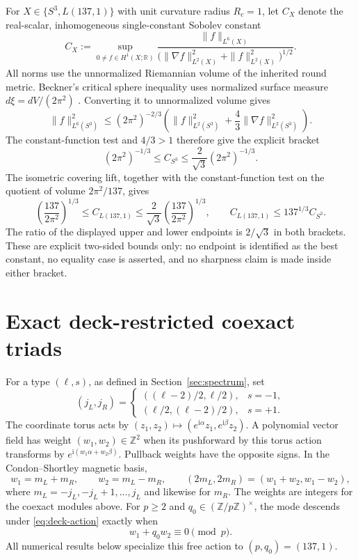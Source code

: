 \documentclass[12pt]{article}
\theoremstyle{definition}
\theoremstyle{remark}
\newcommand{\ZZ}{\mathbb Z}
\newcommand{\ii}{\mathrm i}
\begin{document}
For $X\in\{S^3,L(137,1)\}$ with unit curvature radius $R_c=1$, let $C_X$
denote the real-scalar, inhomogeneous single-constant Sobolev constant
\[
 C_X:=\sup_{0\ne f\in H^1(X;\mathbb R)}
 \frac{\|f\|_{L^6(X)}}
 {\bigl(\|\nabla f\|_{L^2(X)}^2+\|f\|_{L^2(X)}^2\bigr)^{1/2}}.
\]
All norms use the unnormalized Riemannian volume of the inherited round metric.
Beckner's critical sphere inequality uses normalized surface measure
$d\xi=dV/(2\pi^2)$
\cite[p.~4816 and p.~4818, Eq.~(8)]{Beckner1992Sphere}.  Converting it to
unnormalized volume gives
\[
 \|f\|_{L^6(S^3)}^2
 \le (2\pi^2)^{-2/3}
 \left(\|f\|_{L^2(S^3)}^2+\frac43\|\nabla f\|_{L^2(S^3)}^2\right).
\]
The constant-function test and $4/3>1$ therefore give the explicit bracket
\begin{equation}\label{eq:s3-sobolev-bracket}
 (2\pi^2)^{-1/3}
 \le C_{S^3}
 \le \frac2{\sqrt3}(2\pi^2)^{-1/3}.
\end{equation}
The isometric covering lift, together with the constant-function test on the
quotient of volume $2\pi^2/137$, gives
\begin{equation}\label{eq:l137-sobolev-bracket}
 \left(\frac{137}{2\pi^2}\right)^{1/3}
 \le C_{L(137,1)}
 \le \frac2{\sqrt3}\left(\frac{137}{2\pi^2}\right)^{1/3},
 \qquad
 C_{L(137,1)}\le137^{1/3}C_{S^3}.
\end{equation}
The ratio of the displayed upper and lower endpoints is $2/\sqrt3$ in both
brackets.  These are explicit two-sided bounds only: no endpoint is identified
as the best constant, no equality case is asserted, and no sharpness claim is
made inside either bracket.

\section{Exact deck-restricted coexact triads}\label{sec:triads}

For a type $(\ell,s)$, as defined in Section~\ref{sec:spectrum}, set
\[
 (j_L,j_R)=
 \begin{cases}
 ((\ell-2)/2,\ell/2),&s=-1,\\
 (\ell/2,(\ell-2)/2),&s=+1.
\end{cases}
\]
The coordinate torus acts by
$(z_1,z_2)\mapsto(e^{\ii\alpha}z_1,e^{\ii\beta}z_2)$.
A polynomial vector field has weight $(w_1,w_2)\in\ZZ^2$ when its
pushforward by this torus action transforms by
$e^{\ii(w_1\alpha+w_2\beta)}$.  Pullback weights have the opposite signs.
In the Condon--Shortley magnetic basis,
\[
 w_1=m_L+m_R,\qquad w_2=m_L-m_R,
 \qquad (2m_L,2m_R)=(w_1+w_2,w_1-w_2),
\]
where $m_L=-j_L,-j_L+1,\ldots,j_L$ and likewise for $m_R$.
The weights are integers for the coexact modules above.  For $p\ge2$ and
$q_0\in(\ZZ/p\ZZ)^\times$, the mode descends under
\eqref{eq:deck-action} exactly when
\begin{equation}\label{eq:deck}
 w_1+q_0w_2\equiv0\pmod p.
\end{equation}
All numerical results below specialize this free action to $(p,q_0)=(137,1)$.
\end{document}
